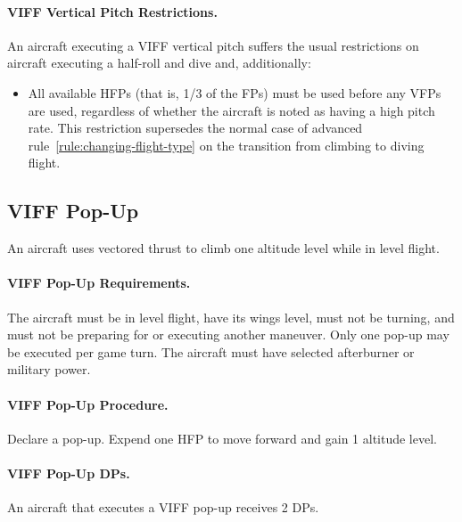 \begin{advancedrules}
{\paragraph{VIFF Vertical Pitch Restrictions.} An aircraft executing a VIFF vertical pitch suffers the usual restrictions on aircraft executing a half-roll and dive and, additionally:

\begin{itemize}

    \item All available HFPs (that is, 1/3 of the FPs) must be used before any VFPs are used, regardless of whether the aircraft is noted as having a high pitch rate. This restriction supersedes the normal case of advanced rule~\ref{rule:changing-flight-type} on the transition from climbing to diving flight.
    
\end{itemize}

\subsection{VIFF Pop-Up}

An aircraft uses vectored thrust to climb one altitude level while in level flight.

\paragraph{VIFF Pop-Up Requirements.} The aircraft must be in level flight, have its wings level, must not be turning, and must not be preparing for or executing another maneuver. Only one pop-up may be executed per game turn. The aircraft must have selected afterburner or military power.

\paragraph{VIFF Pop-Up Procedure.} Declare a pop-up. Expend one HFP to move forward and gain 1 altitude level.

\paragraph{VIFF Pop-Up DPs.} An aircraft that executes a VIFF pop-up receives 2 DPs.

}

\end{advancedrules}
